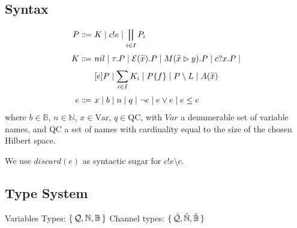 \subsection{Syntax}

\begin{align*}
  P \Coloneqq &\ K \mid c!e 
  \mid \bigparallel_{i \in I} P_i \\[0.1cm]
  K \Coloneqq &\ nil \mid \tau . P \mid \mathcal{E}(\widetilde{x}) . P \mid M(\widetilde{x} \rhd y) . P \mid c?x . P \mid \\[0.1cm]
              &\ [e] P \mid \sum_{i \in I} K_i \mid P \{f\} \mid P \setminus L \mid A(\widetilde{x}) \\[0.1cm]
  e \Coloneqq &\ x \mid b \mid n \mid q \mid \neg e \mid e \lor e \mid e \leq e
\end{align*}	
where $b \in \mathbb{B}$, $n \in \mathbb{N}$, $x \in \text{Var}$, $q \in \text{QC}$, with $Var$ a denumerable set of variable names, and
QC a set of names with cardinality equal to the size of the chosen Hilbert space.

We use $discard(e)$ as syntactic sugar for $c!e \setminus c$.

\subsection{Type System}

Variables Types: $\set{\mathcal{Q}, \mathbb{N}, \mathbb{B}}$
Channel types: $\set{\hat{\mathcal{Q}}, \hat{\mathbb{N}}, \hat{\mathbb{B}}}$

